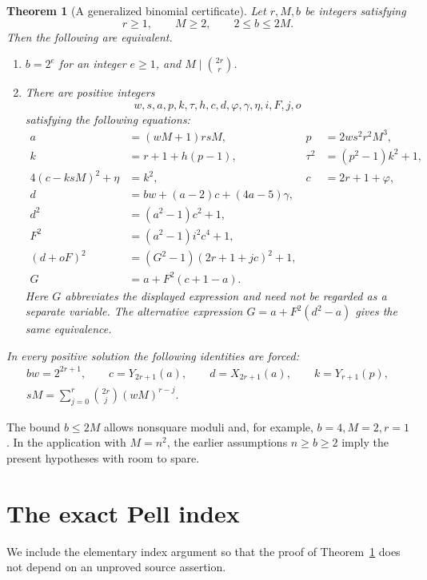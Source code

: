 \documentclass[11pt]{article}
\newtheorem{theorem}{Theorem}
\begin{document}
\begin{theorem}[A generalized binomial certificate]\label{main}
Let \(r,M,b\) be integers satisfying
\[
                    r\ge1,\qquad M\ge2,\qquad 2\le b\le2M.
\]
Then the following are equivalent.
\begin{enumerate}
\item \(b=2^e\) for an integer \(e\ge1\), and
\(M\mid\binom{2r}{r}\).
\item There are positive integers
\[
                 w,s,a,p,k,\tau,h,c,d,\varphi,\gamma,\eta,i,F,j,o
\]
satisfying the following equations:
\begin{align}
 a&=(wM+1)rsM,&p&=2ws^2r^2M^3,\label{ap}\\
 k&=r+1+h(p-1),&\tau^2&=(p^2-1)k^2+1,\label{small}\\
 4(c-ksM)^2+\eta&=k^2,&c&=2r+1+\varphi,\label{close}\\
 d&=bw+(a-2)c+(4a-5)\gamma,\label{linear}\\
 d^2&=(a^2-1)c^2+1,\label{pell1}\\
 F^2&=(a^2-1)i^2c^4+1,\label{pell2}\\
 (d+oF)^2&=(G^2-1)(2r+1+jc)^2+1,\label{pell3}\\
 G&=a+F^2(c+1-a).\label{bridge}
\end{align}
Here \(G\) abbreviates the displayed expression and need not be
regarded as a separate variable.  The alternative expression
\(G=a+F^2(d^2-a)\) gives the same equivalence.
\end{enumerate}
In every positive solution the following identities are forced:
\begin{gather}
 bw=2^{2r+1},\qquad
 c=Y_{2r+1}(a),\qquad d=X_{2r+1}(a),\qquad
 k=Y_{r+1}(p),\label{forced}\\
 sM=\sum_{j=0}^{r}\binom{2r}{j}(wM)^{r-j}.
 \label{forcedY}
\end{gather}
\end{theorem}

The bound \(b\le2M\) allows nonsquare moduli and, for example,
\(b=4,M=2,r=1\).  In the application with \(M=n^2\),
the earlier assumptions \(n\ge b\ge2\) imply the present
hypotheses with room to spare.

\section{The exact Pell index}

We include the elementary index argument so that the proof of
Theorem~\ref{main} does not depend on an unproved source assertion.
\end{document}
